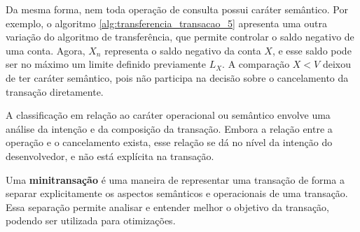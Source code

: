 \documentclass[11pt,twoside,a4paper]{book}
\begin{document}
Da mesma forma, nem toda operação de consulta possui caráter semântico. Por exemplo, o algoritmo \ref{alg:transferencia_transacao_5} apresenta uma outra variação do algoritmo de transferência, que permite controlar o saldo negativo de uma conta. Agora, $X_n$ representa o saldo negativo da conta $X$, e esse saldo pode ser no máximo um limite definido previamente $L_X$. A comparação $X < V$ deixou de ter caráter semântico, pois não participa na decisão sobre o cancelamento da transação diretamente.

A classificação em relação ao caráter operacional ou semântico envolve uma análise da intenção e da composição da transação.
Embora a relação entre a operação e o cancelamento exista, esse relação se dá no nível da intenção do desenvolvedor, e não está explícita na transação.

Uma \textbf{minitransação} é uma maneira de representar uma transação de forma a separar explicitamente os aspectos semânticos e operacionais de uma transação. Essa separação permite analisar e entender melhor o objetivo da transação, podendo ser utilizada para otimizações.




\end{document}
